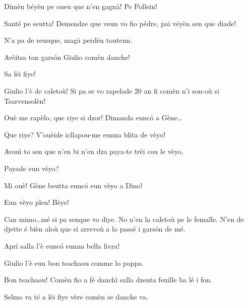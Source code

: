 \begin{drama}
\Djouiyaoueunspeaks{} Dimèn béyèn pe oueu que n'en gagnà! Pe Pollein!


\Marteunspeaks Santé pe seutta! Demendze que veun vo fio pédre, pai véyèn sen que diade!

\Selmospeaks N'a pa de reusque, magà perdèn touteun.




\Djouiyaoudouspeaks{} Avèitsa ton gars\'on Giulio comèn danche!

\Marteunspeaks Sa lèi fiye!

\Selmospeaks	Giulio l'è de caletoù! Si pa se vo rapelade 20 an fi comèn n’i son-où si Tsarvensolèn!


\Djouiyaoueunspeaks Ouè me rapèlo, que riye si dzor! Dimanda eunc\'o a Gène\ldots

\Genespeaks{} Que riye? V'ouèide icllapou-me eunna blita de vèyo!

\Djouiyaoudouspeaks Avouì to sen que n'en bi n’en dza paya-te trèi cou le vèyo.

\Dinospeaks{} Payade eun vèyo?

\Djouiyaoueunspeaks Mi ouè! Gène beutta eunc\'o eun vèyo a Dino!

\Dinospeaks{} Eun vèyo plen! Bèye!

\Selmospeaks {} Can mimo\ldots mé si pa senque vo diye. No n'en la caletoù pe le femalle. N'en de djette é bièn aloù que si arrevoù a lo passé i gars\'on de mé.

\Djouiyaoudouspeaks Aprì salla l'è eunc\'o eunna bella livra!

\Selmospeaks Giulio l’è eun bon tsachaou comme lo pappa.

\Marteunspeaks{} Bon tsachaou! Comèn fio a fé danchì salla dzenta feuille ba lé i fon. 

\Djouiyaoudouspeaks Selmo va té a lèi fiye vère comèn se danche va.


\end{drama}
